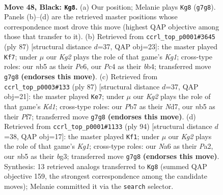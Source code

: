 \documentclass[11pt]{article}
\begin{document}
\clearpage

\begin{figure}[p]\centering
\begin{subfigure}{0.46\textwidth}\centering
\resizebox{\linewidth}{!}{%
\newchessgame
\chessboard[
  setfen={8/1p2p1k1/n5pp/pN5r/P1p5/2P2PK1/3R4/B7 b - - 2 48},
  showmover=false,
  pgfstyle=straightmove, color=movearrow, markmove={g7-g8}
]}
\caption{}
\end{subfigure}\hfill
\begin{subfigure}{0.46\textwidth}\centering
\resizebox{\linewidth}{!}{%
\newchessgame
\chessboard[
  setfen={2r3k1/1p5p/p3p3/P7/1B1Np1P1/1P5P/8/5K2 b - - 2 44},
  showmover=false,
  pgfstyle=straightmove, color=movearrow, markmove={g8-f7}
]}
\caption{}
\end{subfigure}
\\[4pt]
\begin{subfigure}{0.46\textwidth}\centering
\resizebox{\linewidth}{!}{%
\newchessgame
\chessboard[
  setfen={3k4/3n1p2/2RN4/p3p2p/4P1pP/r5P1/5P2/6K1 b - - 7 44},
  showmover=false,
  pgfstyle=straightmove, color=movearrow, markmove={d8-e7}
]}
\caption{}
\end{subfigure}\hfill
\begin{subfigure}{0.46\textwidth}\centering
\resizebox{\linewidth}{!}{%
\newchessgame
\chessboard[
  setfen={8/6r1/2P3p1/p1P1k3/2B1p2p/2R3bP/P5P1/6K1 w - - 8 48},
  showmover=false,
  pgfstyle=straightmove, color=movearrow, markmove={g1-f1}
]}
\caption{}
\end{subfigure}
\caption{\textbf{Move 48, Black: \texttt{Kg8}.} (a) Our position; Melanie plays \texttt{Kg8} (\texttt{g7g8}). Panels (b)--(d) are the retrieved master positions whose correspondence most drove this move (highest QAP objective among those that transfer to it). (b) Retrieved from \texttt{ccrl\_top\_p0001\#3645} (ply 87) [structural distance $d$=37, QAP obj=23]: the master played \texttt{Kf7}; under $\mu$ our \emph{Kg2} plays the role of that game's \emph{Kg1}; cross-type roles: our \emph{n}b5 as their \emph{P}e6, our \emph{P}c4 as their \emph{b}b4; transferred move \texttt{g7g8} \textbf{(endorses this move)}. (c) Retrieved from \texttt{ccrl\_top\_p0003\#133} (ply 87) [structural distance $d$=37, QAP obj=21]: the master played \texttt{Ke7}; under $\mu$ our \emph{Kg2} plays the role of that game's \emph{Kd1}; cross-type roles: our \emph{P}b7 as their \emph{N}d7, our \emph{n}b5 as their \emph{P}f7; transferred move \texttt{g7g8} \textbf{(endorses this move)}. (d) Retrieved from \texttt{ccrl\_top\_p0001\#1133} (ply 94) [structural distance $d$=38, QAP obj=17]: the master played \texttt{Kf1}; under $\mu$ our \emph{Kg2} plays the role of that game's \emph{Kg1}; cross-type roles: our \emph{N}a6 as their \emph{P}a2, our \emph{n}b5 as their \emph{b}g3; transferred move \texttt{g7g8} \textbf{(endorses this move)}. Synthesis: 13 retrieved analogs transferred to \texttt{Kg8} (summed QAP objective 159, the strongest correspondence among the candidate moves); Melanie committed it via the \texttt{search} selector.}
\label{fig:thought-m95}
\end{figure}
\end{document}
